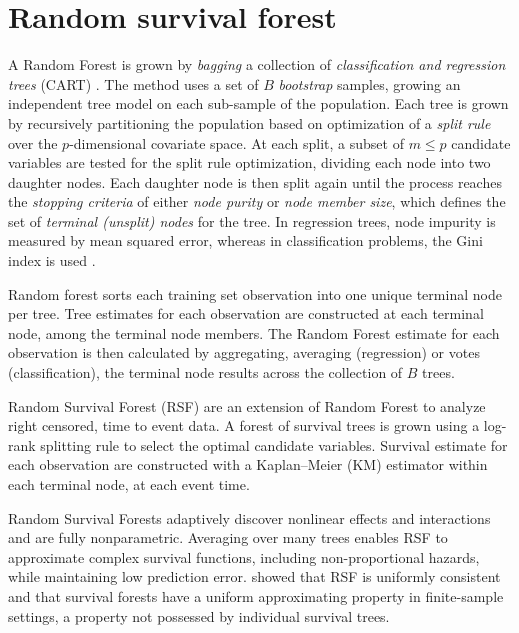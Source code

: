 \documentclass[article]{jss}
\begin{document}
\section{Random survival forest}\label{random-survival-forest}

A Random Forest \citep{Breiman:2001} is grown by \emph{bagging}
\citep{Breiman:1996} a collection of
\emph{classification and regression trees} (CART) \citep{cart:1984}. The
method uses a set of \(B\) \emph{bootstrap} \citep{bootstrap:1994}
samples, growing an independent tree model on each sub-sample of the
population. Each tree is grown by recursively partitioning the
population based on optimization of a \emph{split rule} over the
\(p\)-dimensional covariate space. At each split, a subset of
\(m \le p\) candidate variables are tested for the split rule
optimization, dividing each node into two daughter nodes. Each daughter
node is then split again until the process reaches the
\emph{stopping criteria} of either \emph{node purity} or
\emph{node member size}, which defines the set of
\emph{terminal (unsplit) nodes} for the tree. In regression trees, node
impurity is measured by mean squared error, whereas in classification
problems, the Gini index is used \citep{Friedman:2000}.

Random forest sorts each training set observation into one unique
terminal node per tree. Tree estimates for each observation are
constructed at each terminal node, among the terminal node members. The
Random Forest estimate for each observation is then calculated by
aggregating, averaging (regression) or votes (classification), the
terminal node results across the collection of \(B\) trees.

Random Survival Forest \citep{Ishwaran:2007, Ishwaran:2008} (RSF) are an
extension of Random Forest to analyze right censored, time to event
data. A forest of survival trees is grown using a log-rank splitting
rule to select the optimal candidate variables. Survival estimate for
each observation are constructed with a Kaplan--Meier (KM) estimator
within each terminal node, at each event time.

Random Survival Forests adaptively discover nonlinear effects and
interactions and are fully nonparametric. Averaging over many trees
enables RSF to approximate complex survival functions, including
non-proportional hazards, while maintaining low prediction error.
\citep{Ishwaran:2010a} showed that RSF is uniformly consistent and that
survival forests have a uniform approximating property in finite-sample
settings, a property not possessed by individual survival trees.
\end{document}
